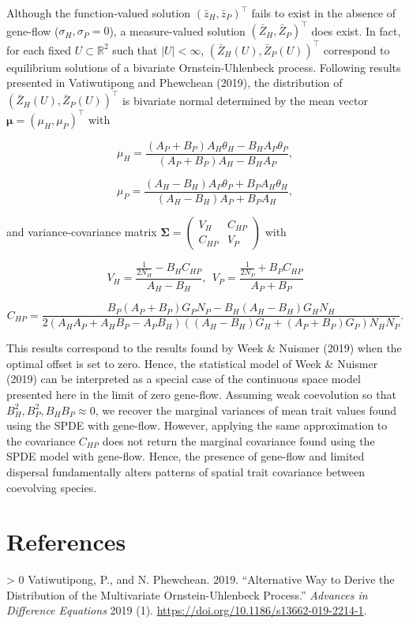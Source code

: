 \documentclass{article}
\newlength{\cslhangindent}
\newenvironment{CSLReferences}[3] %
 {%
  \setlength{\parindent}{0pt}
  \ifodd #1 \everypar{\setlength{\hangindent}{\cslhangindent}}\ignorespaces\fi
  \ifnum #2 > 0
  \setlength{\parskip}{#2\baselineskip}
  \fi
 }%
 {}
\begin{document}
Although the function-valued solution \((\bar z_H,\bar z_P)^\top\) fails
to exist in the absence of gene-flow (\(\sigma_H,\sigma_P=0\)), a
measure-valued solution \((\bar Z_H,\bar Z_P)^\top\) does exist. In
fact, for each fixed \(U\subset\mathbb R^2\) such that \(|U|<\infty\),
\((\bar Z_H(U),\bar Z_P(U))^\top\) correspond to equilibrium solutions
of a bivariate Ornstein-Uhlenbeck process. Following results presented
in Vatiwutipong and Phewchean (2019), the distribution of
\((\bar Z_H(U),\bar Z_P(U))^\top\) is bivariate normal determined by the
mean vector \(\pmb\mu=(\mu_H,\mu_P)^\top\) with

\[\mu_H=\frac{(A_P+B_P)A_H\theta_H-B_HA_P\theta_P}{(A_P+B_P)A_H-B_HA_P},\]

\[\mu_P=\frac{(A_H-B_H)A_P\theta_P+B_PA_H\theta_H}{(A_H-B_H)A_P+B_PA_H},\]

and variance-covariance matrix
\(\pmb\Sigma=\left(\begin{smallmatrix}V_H & C_{HP} \\ C_{HP} & V_P\end{smallmatrix}\right)\)
with

\[V_H=\frac{\frac{1}{2N_H}-B_HC_{HP}}{A_H-B_H}, \ \ V_P=\frac{\frac{1}{2N_P}+B_PC_{HP}}{A_P+B_P}\]

\[C_{HP}=\frac{B_P(A_P+B_P)G_PN_P-B_H(A_H-B_H)G_HN_H}{2(A_HA_P+A_HB_P-A_PB_H)((A_H-B_H)G_H+(A_P+B_P)G_P)N_HN_P}.\]

This results correspond to the results found by Week \& Nuismer (2019)
when the optimal offset is set to zero. Hence, the statistical model of
Week \& Nuismer (2019) can be interpreted as a special case of the
continuous space model presented here in the limit of zero gene-flow.
Assuming weak coevolution so that \(B_H^2,B_P^2,B_HB_P\approx0\), we
recover the marginal variances of mean trait values found using the SPDE
with gene-flow. However, applying the same approximation to the
covariance \(C_{HP}\) does not return the marginal covariance found
using the SPDE model with gene-flow. Hence, the presence of gene-flow
and limited dispersal fundamentally alters patterns of spatial trait
covariance between coevolving species.

\newpage

\hypertarget{references}{%
\section*{References}\label{references}}

\hypertarget{refs}{}
\begin{CSLReferences}{1}{0}
\leavevmode\hypertarget{ref-Vatiwutipong2019}{}%
Vatiwutipong, P., and N. Phewchean. 2019. {``Alternative Way to Derive
the Distribution of the Multivariate Ornstein-Uhlenbeck Process.''}
\emph{Advances in Difference Equations} 2019 (1).
\url{https://doi.org/10.1186/s13662-019-2214-1}.

\end{CSLReferences}



\end{document}

